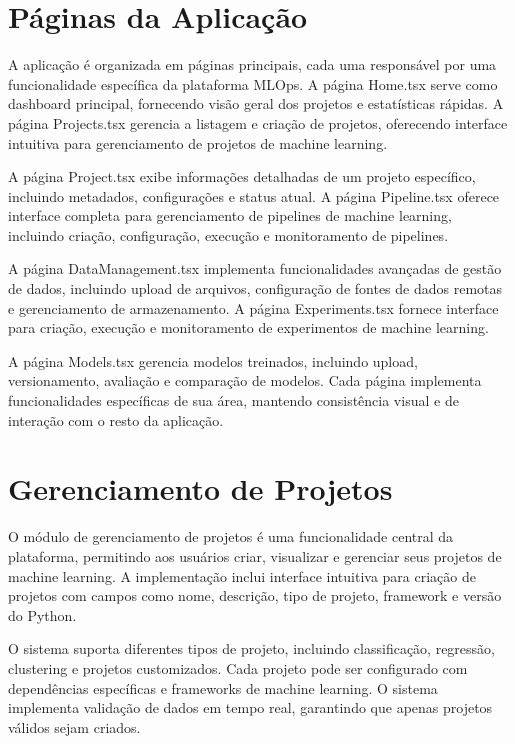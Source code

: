 \documentclass[12pt,a4paper]{article}
\begin{document}
\section{Páginas da Aplicação}

A aplicação é organizada em páginas principais, cada uma responsável por uma funcionalidade específica da plataforma MLOps. A página Home.tsx serve como dashboard principal, fornecendo visão geral dos projetos e estatísticas rápidas. A página Projects.tsx gerencia a listagem e criação de projetos, oferecendo interface intuitiva para gerenciamento de projetos de machine learning.

A página Project.tsx exibe informações detalhadas de um projeto específico, incluindo metadados, configurações e status atual. A página Pipeline.tsx oferece interface completa para gerenciamento de pipelines de machine learning, incluindo criação, configuração, execução e monitoramento de pipelines.

A página DataManagement.tsx implementa funcionalidades avançadas de gestão de dados, incluindo upload de arquivos, configuração de fontes de dados remotas e gerenciamento de armazenamento. A página Experiments.tsx fornece interface para criação, execução e monitoramento de experimentos de machine learning.

A página Models.tsx gerencia modelos treinados, incluindo upload, versionamento, avaliação e comparação de modelos. Cada página implementa funcionalidades específicas de sua área, mantendo consistência visual e de interação com o resto da aplicação.

\section{Gerenciamento de Projetos}

O módulo de gerenciamento de projetos é uma funcionalidade central da plataforma, permitindo aos usuários criar, visualizar e gerenciar seus projetos de machine learning. A implementação inclui interface intuitiva para criação de projetos com campos como nome, descrição, tipo de projeto, framework e versão do Python.

O sistema suporta diferentes tipos de projeto, incluindo classificação, regressão, clustering e projetos customizados. Cada projeto pode ser configurado com dependências específicas e frameworks de machine learning. O sistema implementa validação de dados em tempo real, garantindo que apenas projetos válidos sejam criados.
\end{document}
